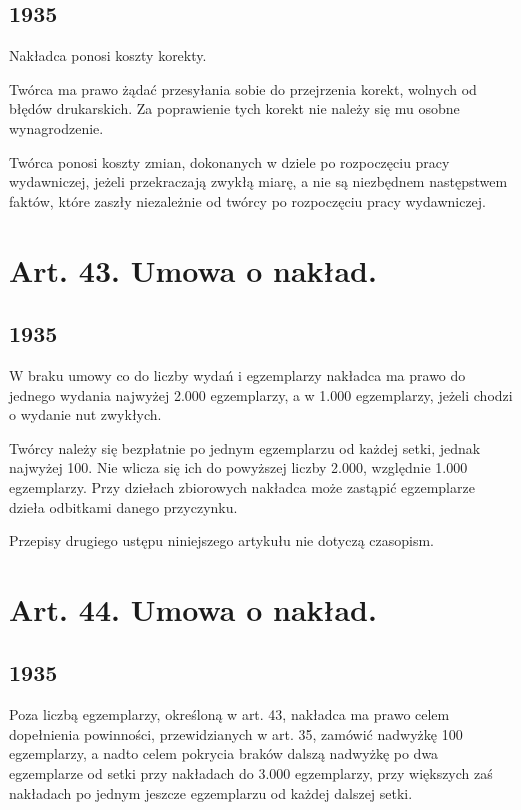 \documentclass[withmarginpar]{book}
\begin{document}
\subsection{1935}
\label{sec:art.-42-1}

Nakładca ponosi koszty korekty.

Twórca ma prawo żądać przesyłania sobie do przejrzenia korekt, wolnych
od błędów drukarskich. Za poprawienie tych korekt nie należy się mu
osobne wynagrodzenie.

Twórca ponosi koszty zmian, dokonanych w dziele po rozpoczęciu pracy
wydawniczej, jeżeli przekraczają zwykłą miarę, a nie są niezbędnem
następstwem faktów, które zaszły niezależnie od twórcy po rozpoczęciu
pracy wydawniczej.

\section{Art. 43. Umowa o nakład.}
\label{sec:art.-43}
\subsection{1935}
\label{sec:art.-43-1}

W braku umowy co do liczby wydań i egzemplarzy nakładca ma prawo do
jednego wydania najwyżej 2.000 egzemplarzy, a w 1.000 egzemplarzy,
jeżeli chodzi o wydanie nut zwykłych.

Twórcy należy się bezpłatnie po jednym egzemplarzu od każdej setki,
jednak najwyżej 100. Nie wlicza się ich do powyższej liczby 2.000,
względnie 1.000 egzemplarzy. Przy dziełach zbiorowych nakładca może
zastąpić egzemplarze dzieła odbitkami danego przyczynku.

Przepisy drugiego ustępu niniejszego artykułu nie dotyczą czasopism.

\section{Art. 44. Umowa o nakład.}
\label{sec:art.-44}
\subsection{1935}
\label{sec:art.-44-1}

Poza liczbą egzemplarzy, określoną w art. 43, nakładca ma prawo celem
dopełnienia powinności, przewidzianych w art. 35, zamówić nadwyżkę 100
egzemplarzy, a nadto celem pokrycia braków dalszą nadwyżkę po dwa
egzemplarze od setki przy nakładach do 3.000 egzemplarzy, przy
większych zaś nakładach po jednym jeszcze egzemplarzu od każdej
dalszej setki.
\end{document}
